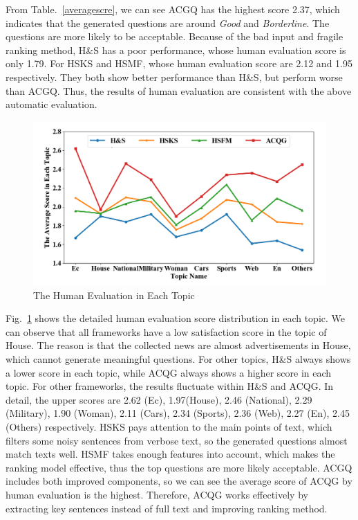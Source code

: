 \documentclass[runningheads,UTF8,article]{comsis2}
\newcommand\revised[1]{{\color{red} #1}}
\begin{document}
	\revised{From Table.~\ref{averagescre}, we can see ACGQ has the highest score 2.37, which indicates that the generated questions are around \emph{Good} and \emph{Borderline}. The questions are more likely to be acceptable. Because of the bad input and fragile ranking method, H\&S has a poor performance, whose human evaluation score is only 1.79. 
	For HSKS and HSMF, whose human evaluation score are 2.12 and 1.95 respectively. They both show better performance than H\&S, but perform worse than ACGQ. Thus, the results of human evaluation are consistent with the above automatic evaluation.}
	
	\begin{figure}[!ht]
		\centering
		\includegraphics[width=0.7\linewidth]{score}
		\caption{The Human Evaluation in Each Topic}
		\label{classcore}
	\end{figure}
	
	
	
	Fig.~\ref{classcore} shows the detailed human evaluation score distribution in each topic. We can observe that all frameworks have a low satisfaction score in the topic of House. The reason is that the collected news are almost advertisements in House, which cannot generate meaningful questions. For other topics, H\&S always shows a lower score in each topic, while ACQG always shows a higher score in each topic. For other frameworks, the results fluctuate within H\&S and ACQG. In detail, the upper scores are 2.62 (Ec), 1.97(House), 2.46 (National), 2.29 (Military), 1.90 (Woman), 2.11 (Cars), 2.34 (Sports), 2.36 (Web), 2.27 (En), 2.45 (Others) respectively. HSKS pays attention to the main points of text, which filters some noisy sentences from verbose text, so the generated questions almost match texts well. HSMF takes enough features into account, which makes the ranking model effective, thus the top questions are more likely acceptable. ACGQ includes both improved components, so we can see the average score of ACQG by human evaluation is the highest. Therefore, ACQG works effectively by extracting key sentences instead of full text and improving ranking method.
	
\end{document}

